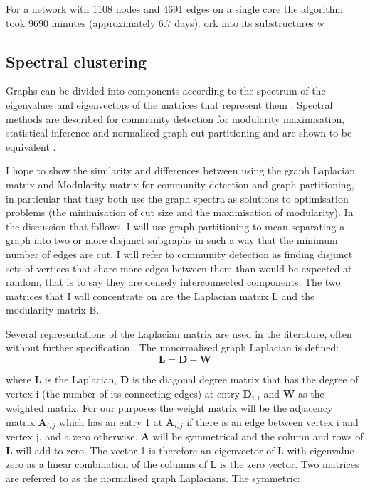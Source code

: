 For a network with 1108 nodes and 4691 edges on a single core the algorithm took 9690 minutes (approximately 6.7 days). \cite{mclean2016improved}
ork into its substructures w

\subsection{Spectral clustering}
Graphs can be divided into components according to the spectrum of the eigenvalues and
eigenvectors of the matrices that represent them \cite{newman2006finding}. Spectral methods are described for community detection for modularity maximisation, statistical inference and normalised graph cut partitioning and are shown to be equivalent \cite{newman2013spectral}.

I hope to show the similarity and differences between using the graph Laplacian matrix
and Modularity matrix for community detection and graph partitioning, in particular that
they both use the graph spectra as solutions to optimisation problems (the minimisation
of cut size and the maximisation of modularity).
In the discussion that follows, I will use graph partitioning to mean separating a graph
into two or more disjunct subgraphs in such a way that the minimum number of edges are
cut. I will refer to community detection as finding disjunct sets of vertices that share more
edges between them than would be expected at random, that is to say they are densely
interconnected components.
The two matrices that I will concentrate on are the Laplacian matrix L and the modularity
matrix B.

Several representations of the Laplacian matrix are used in the literature, often without
further specification \cite{von2007tutorial}.
The unnormalised graph Laplacian is defined:
\begin{equation}
    \mathbf{L} = \mathbf{D} - \mathbf{W}
\end{equation}

where $\mathbf{L}$ is the Laplacian, $\mathbf{D}$ is the diagonal degree matrix that has the degree of vertex i
(the number of its connecting edges) at entry $\mathbf{D}_{i,i}$ and $\mathbf{W}$ as the weighted matrix.
For our purposes the weight matrix will be the adjacency matrix $\mathbf{A}_{i,j}$ which has an entry
1 at $\mathbf{A}_{i,j}$ if there is an edge between vertex i and vertex j, and a zero otherwise.
$\mathbf{A}$ will be symmetrical and the column and rows of $\mathbf{L}$ will add to zero. The vector 1 is
therefore an eigenvector of L with eigenvalue zero as a linear combination of the columns
of L is the zero vector.
Two matrices are referred to as the normalised graph Laplacians. The symmetric:
    
